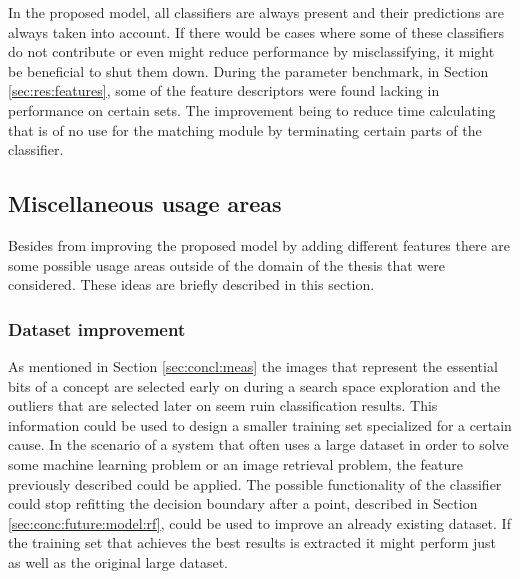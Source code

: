 In the proposed model, all classifiers are always present and their predictions are always taken into account. If there would be cases where some of these classifiers do not contribute or even might reduce performance by misclassifying, it might be beneficial to shut them down. During the parameter benchmark, in Section \ref{sec:res:features}, some of the feature descriptors were found lacking in performance on certain sets. The improvement being to reduce time calculating that is of no use for the matching module by terminating certain parts of the classifier.

\subsection{Miscellaneous usage areas}
\label{sec:conc:future:misc}
Besides from improving the proposed model by adding different features there are some possible usage areas outside of the domain of the thesis that were considered. These ideas are briefly described in this section.
\subsubsection{Dataset improvement}
\label{sec:conc:future:misc:data}

As mentioned in Section \ref{sec:concl:meas} the images that represent the essential bits of a concept are selected early on during a search space exploration and the outliers that are selected later on seem ruin classification results. This information could be used to design a smaller training set specialized for a certain cause. 
In the scenario of a system that often uses a large dataset in order to solve some machine learning problem or an image retrieval problem, the feature previously described could be applied. The possible functionality of the classifier could stop refitting the decision boundary after a point, described in Section \ref{sec:conc:future:model:rf}, could be used to improve an already existing dataset. If the training set that achieves the best results is extracted it might perform just as well as the original large dataset.
